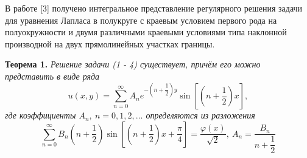 \documentclass[a4paper, 9pt]{article}
\begin{document}
	В работе [3] получено интегральное представление регулярного решения задачи для уравнения Лапласа
	в полукруге с краевым условием первого рода на полуокружности и двумя различными
	краевыми условиями типа наклонной производной на двух прямолинейных участках границы.
	\par
	\textbf{Теорема 1.} \textit{Решение задачи (1 - 4) существует, причём его можно представить в виде ряда}
		\begin{equation}
			u(x,y) = \sum\limits_{n=0}^{\infty} A_n e^{-\left(n + \dfrac12\right)y} \sin{\left[\left(n + \dfrac12\right)x\right]},
		\end{equation}
		\textit{где коэффициенты $A_n, \ n =0,1,2, \dots$ определяются из разложения}
		\begin{equation}
			\sum\limits_{n=0}^{\infty} B_n \left(n + \dfrac12 \right) \sin{\left[\left(n +\dfrac12\right)x + \dfrac\pi4\right]} = \dfrac{\varphi(x)}{\sqrt2}, \ A_n = \dfrac{B_n}{n+\dfrac12}
		\end{equation}
	
\end{document}
